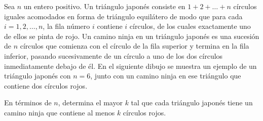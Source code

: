 Sea $n$ un entero positivo. Un triángulo japonés consiste en $1 + 2 + \dots + n$ círculos iguales acomodados en forma de triángulo equilátero de modo que para cada $i = 1, 2, \dots , n$, la fila número $i$ contiene $i$ círculos, de los cuales exactamente uno de ellos se pinta de rojo. Un camino ninja en un triángulo japonés es una sucesión de $n$ círculos que comienza con el círculo de la fila superior y termina en la fila inferior, pasando sucesivamente de un círculo a uno de los dos círculos inmediatamente debajo de él. En el siguiente dibujo se muestra un ejemplo de un triángulo japonés con $n = 6$, junto con un camino ninja en ese triángulo que contiene dos círculos rojos. \newline 

En términos de $n$, determina el mayor $k$ tal que cada triángulo japonés tiene un camino ninja que contiene al menos $k$ círculos rojos.
